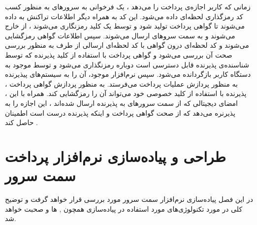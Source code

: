 \documentclass[oneside]{report}
\begin{document}
  زمانی که کاربر اجازه‌ی پرداخت را می‌دهد ، یک فرخوانی به سرورهای 
  {\normalsize {}} 
  به منظور کسب کد رمزگذاری لحظه‌ای 
     داده می‌شود. این کد به همراه دیگر اطلاعات تراکنش به 
      {\normalsize {}} 
      داده می‌شوند تا گواهی پرداخت 
      تولید شود و توسط یک کلید 
       {\normalsize {}} 
    رمزنگاری می‌شوند ، از 
     {\normalsize {}} 
     خارج می‌شوند 
    و به سمت سروهای 
     {\normalsize {}} 
     ارسال می‌شوند. سپس اطلاعات گواهی رمزگشایی می‌شوند و کد لحظه‌ای درون گواهی با کد لحظه‌ای ارسالی از طرف 
          {\normalsize {}} 
    به منظور بررسی صحت آن بررسی می‌شود و گواهی پرداخت با استفاده از کلید پذیرنده که توسط شناسنده‌ی پذیرنده قابل دسترسی است دوباره رمزنگذاری می‌شود و  توسط 
         {\normalsize {}} 
         موجود به دستگاه کاربر بازگردانده می‌شود.  سپس نرم‌افزار موجود، آن را به سیستم‌های پیذیرنده به منظور پردازش عملیات پرداخت می‌فرستد. به منظور پردازش گواهی پرداخت ، پذیرنده با استفاده از کلید خصوصی 
         خود می‌تواند آن را رمزگشایی کند. همراه با این ، امضای دیجیتالی که از سمت سرورهای 
         {\normalsize {}} 
                به پذیرنده ارسال شده‌اند ، این اجازه را به پذیرنره می‌دهد که از صحت گواهی پرداخت و اینکه پذیرنده درست است اطمینان حاصل کند .      
      \cite{iossecurity}
               
               
 
		
		
		\chapter{طراحی و پیاده‌سازی نرم‌افزار پرداخت سمت سرور}\label{serverimplementation}
در این فصل پیاده‌سازی نرم‌افزار سمت سرور 
 مورد بررسی قرار خواهد گرفت و توضیح کلی در مورد تکنولوژی‌های مورد استفاده در پیاده‌سازی همچون 
         {\normalsize {}}
         , 
                  {\normalsize {}} ها
                  و 
                           {\normalsize {}}
                              صحبت خواهد شد. 
                              
\end{document}
